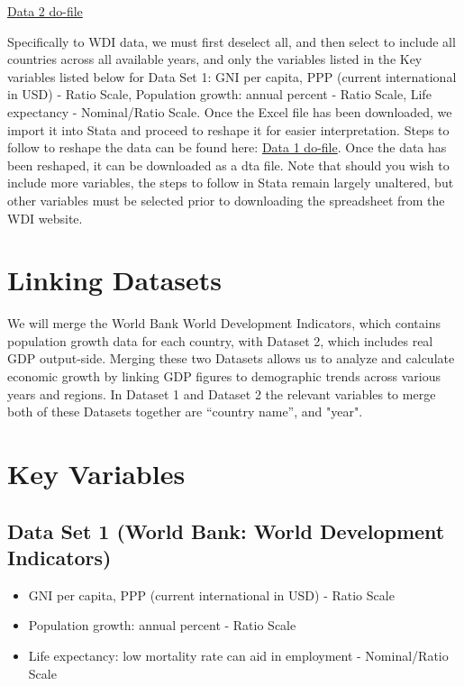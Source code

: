 \documentclass[12pt]{article}
\begin{document}
\href{https://github.com/ecn310/course-project-development/blob/main/Penn%20World%20Table%20(PWT)%20version%2010.01.do}{Data 2 do-file} 

Specifically to WDI data, we must first deselect all, and then select to include all countries across all available years, and only the variables listed in the Key variables listed below for Data Set 1: GNI per capita, PPP (current international in USD) - Ratio Scale, Population growth: annual percent -  Ratio Scale,  Life expectancy - Nominal/Ratio Scale. Once the Excel file has been downloaded, we import it into Stata and proceed to reshape it for easier interpretation. Steps to follow to reshape the data can be found here: \href{https://github.com/ecn310/course-project-development/blob/main/WDI.do}{Data 1 do-file}.
Once the data has been reshaped, it can be downloaded as a dta file. Note that should you wish to include more variables, the steps to follow in Stata remain largely unaltered, but other variables must be selected prior to downloading the spreadsheet from the WDI website. 


\section{Linking Datasets}
\label{sec:discussion}

We will merge the World Bank World Development Indicators, which contains population growth data for each country, with Dataset 2, which includes real GDP output-side. Merging these two Datasets allows us to analyze and calculate economic growth by linking GDP figures to demographic trends across various years and regions. In Dataset 1 and Dataset 2 the relevant variables to merge both of these Datasets together are “country name”, and "year". 


\section{Key Variables}
\label{sec:result}

\subsection{Data Set 1 (World Bank: World Development Indicators)}

\begin{itemize}
    \item GNI per capita, PPP (current international in USD) - Ratio Scale 
    \item Population growth: annual percent -  Ratio Scale 
    \item Life expectancy: low mortality rate can aid in employment - Nominal/Ratio Scale 
\end{itemize}
\end{document}
